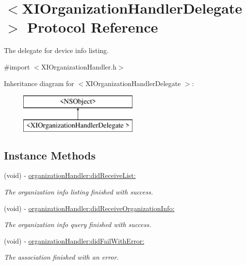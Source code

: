 \hypertarget{protocol_x_i_organization_handler_delegate_01-p}{}\section{$<$X\+I\+Organization\+Handler\+Delegate $>$ Protocol Reference}
\label{protocol_x_i_organization_handler_delegate_01-p}


The delegate for device info listing.  




{\ttfamily \#import $<$X\+I\+Organization\+Handler.\+h$>$}

Inheritance diagram for $<$X\+I\+Organization\+Handler\+Delegate $>$\+:\begin{figure}[H]
\begin{center}
\leavevmode
\includegraphics[height=2.000000cm]{protocol_x_i_organization_handler_delegate_01-p}
\end{center}
\end{figure}
\subsection*{Instance Methods}
\begin{DoxyCompactItemize}
\item 
(void) -\/ \hyperlink{protocol_x_i_organization_handler_delegate_01-p_a31f995db2b5e2e00169950a217ad6475}{organization\+Handler\+:did\+Receive\+List\+:}
\begin{DoxyCompactList}\small\item\em The organization info listing finished with success. \end{DoxyCompactList}\item 
(void) -\/ \hyperlink{protocol_x_i_organization_handler_delegate_01-p_a5e44780373062b185cf11e3598b39cdf}{organization\+Handler\+:did\+Receive\+Organization\+Info\+:}
\begin{DoxyCompactList}\small\item\em The organization info query finished with success. \end{DoxyCompactList}\item 
(void) -\/ \hyperlink{protocol_x_i_organization_handler_delegate_01-p_a2731d197e18e9b397a7ee33e46c35fb1}{organization\+Handler\+:did\+Fail\+With\+Error\+:}
\begin{DoxyCompactList}\small\item\em The association finished with an error. \end{DoxyCompactList}\end{DoxyCompactItemize}


